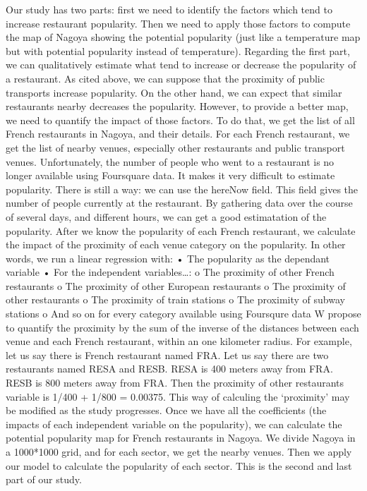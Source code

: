\documentclass[12pt,a4paper]{article}
\begin{document}
Our study has two parts: first we need to identify the factors which tend to increase restaurant popularity. Then we need to apply those factors to compute the map of Nagoya showing the potential popularity (just like a temperature map but with potential popularity instead of temperature).
Regarding the first part, we can qualitatively estimate what tend to increase or decrease the popularity of a restaurant. As cited above, we can suppose that the proximity of public transports increase popularity. On the other hand, we can expect that similar restaurants nearby decreases the popularity. However, to provide a better map, we need to quantify the impact of those factors. To do that, we get the list of all French restaurants in Nagoya, and their details. For each French restaurant, we get the list of nearby venues, especially other restaurants and public transport venues. 
Unfortunately, the number of people who went to a restaurant is no longer available using Foursquare data. It makes it very difficult to estimate popularity. There is still a way: we can use the hereNow field. This field gives the number of people currently at the restaurant. By gathering data over the course of several days, and different hours, we can get a good estimatation of the popularity.
After we know the popularity of each French restaurant, we calculate the impact of the proximity of each venue category on the popularity. In other words, we run a linear regression with:
•	The popularity as the dependant variable
•	For the independent variables…:
o	The proximity of other French restaurants 
o	The proximity of other European restaurants
o	The proximity of other restaurants
o	The proximity of train stations
o	The proximity of subway stations
o	And so on for every category available using Foursqure data
W propose to quantify the proximity by the sum of the inverse of the distances between each venue and each French restaurant, within an one kilometer radius. For example, let us say there is French restaurant named FRA. Let us say there are two restaurants named RESA and RESB. RESA is 400 meters away from FRA. RESB is 800 meters away from FRA. Then the proximity of other restaurants variable is 1/400 + 1/800 = 0.00375. This way of calculing the ‘proximity’ may be modified as the study progresses. 
Once we have all the coefficients (the impacts of each independent variable on the popularity), we can calculate the potential popularity map for French restaurants in Nagoya. We divide Nagoya in a 1000*1000 grid, and for each sector, we get the nearby venues. Then we apply our model to calculate the popularity of each sector. This is the second and last part of our study.
\end{document}
